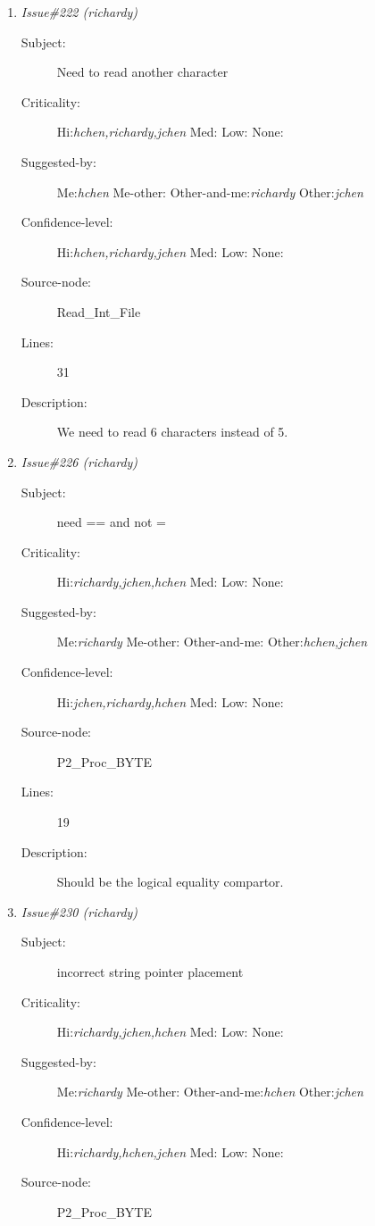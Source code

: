 \begin{enumerate}
\begin{description}
\item [Lines:] 18

\item [Description:] source-{\tt >}comline will always be initialized to
false.
\end{description}
\item {\it Issue\#222 (richardy)}
\begin{description}
\item [Subject:] Need to read another character
\item [Criticality:] Hi:{\it hchen,richardy,jchen} Med:{\it } Low:{\it } None:{\it }
\item [Suggested-by:] Me:{\it hchen} Me-other:{\it } Other-and-me:{\it richardy} Other:{\it jchen}
\item [Confidence-level:] Hi:{\it hchen,richardy,jchen} Med:{\it } Low:{\it } None:{\it }
\item [Source-node:] Read\_Int\_File

\item [Lines:] 31

\item [Description:] We need to read 6 characters instead of 5.
\end{description}
\item {\it Issue\#226 (richardy)}
\begin{description}
\item [Subject:] need == and not =
\item [Criticality:] Hi:{\it richardy,jchen,hchen} Med:{\it } Low:{\it } None:{\it }
\item [Suggested-by:] Me:{\it richardy} Me-other:{\it } Other-and-me:{\it } Other:{\it hchen,jchen}
\item [Confidence-level:] Hi:{\it jchen,richardy,hchen} Med:{\it } Low:{\it } None:{\it }
\item [Source-node:] P2\_Proc\_BYTE

\item [Lines:] 19

\item [Description:] Should be the logical equality compartor.
\end{description}
\item {\it Issue\#230 (richardy)}
\begin{description}
\item [Subject:] incorrect string pointer placement
\item [Criticality:] Hi:{\it richardy,jchen,hchen} Med:{\it } Low:{\it } None:{\it }
\item [Suggested-by:] Me:{\it richardy} Me-other:{\it } Other-and-me:{\it hchen} Other:{\it jchen}
\item [Confidence-level:] Hi:{\it richardy,hchen,jchen} Med:{\it } Low:{\it } None:{\it }
\item [Source-node:] P2\_Proc\_BYTE


\end{description}
\end{enumerate}

